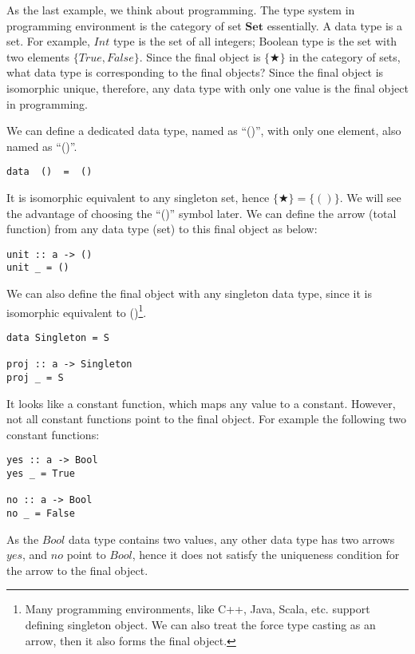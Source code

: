 \documentclass{article}
\begin{document}
\begin{example}
\normalfont

As the last example, we think about programming. The type system in programming environment is the category of set $\pmb{Set}$ essentially. A data type is a set. For example, $Int$ type is the set of all integers; Boolean type is the set with two elements $\{True, False\}$. Since the final object is $\{ \bigstar \}$ in the category of sets, what data type is corresponding to the final objects? Since the final object is isomorphic unique, therefore, any data type with only one value is the final object in programming.

We can define a dedicated data type, named as ``()'', with only one element, also named as ``()''.

\begin{lstlisting}
data  ()  =  ()
\end{lstlisting}

It is isomorphic equivalent to any singleton set, hence $\{ \bigstar \} = \{()\}$. We will see the advantage of choosing the ``()'' symbol later. We can define the arrow (total function) from any data type (set) to this final object as below:

\begin{lstlisting}
unit :: a -> ()
unit _ = ()
\end{lstlisting}

We can also define the final object with any singleton data type, since it is isomorphic equivalent to ()\footnote{Many programming environments, like C++, Java, Scala, etc. support defining singleton object. We can also treat the force type casting as an arrow, then it also forms the final object.}.

\begin{lstlisting}
data Singleton = S

proj :: a -> Singleton
proj _ = S
\end{lstlisting}

It looks like a constant function, which maps any value to a constant. However, not all constant functions point to the final object. For example the following two constant functions:

\begin{lstlisting}
yes :: a -> Bool
yes _ = True

no :: a -> Bool
no _ = False
\end{lstlisting}

As the $Bool$ data type contains two values, any other data type has two arrows $yes$, and $no$ point to $Bool$, hence it does not satisfy the uniqueness condition for the arrow to the final object.


\end{example}
\end{document}
